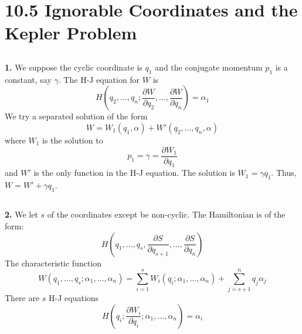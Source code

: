 \documentclass{article}
\begin{document}
	\section*{10.5 Ignorable Coordinates and the Kepler Problem}
	
	\subsection*{}
	\textbf{1.} We suppose the cyclic coordinate is $q_1$ and the conjugate momentum $p_1$ is a constant, say $\gamma$.
	The H-J equation for $W$ is
	\begin{equation*}
		H\left(q_2, \dots, q_n; \frac{\partial W}{\partial q_2}, \dots, \frac{\partial W}{\partial q_n}\right) = \alpha_1
	\end{equation*}
	We try a separated solution of the form
	\begin{equation*}
		W = W_1(q_1, \alpha) + W'(q_2, \dots, q_n, \alpha)
	\end{equation*}
	where $W_1$ is the solution to
	\begin{equation*}
		p_1 = \gamma = \frac{\partial W_1}{\partial q_1}
	\end{equation*}
	and $W'$ is the only function in the H-J equation.
	The solution is $W_1 = \gamma q_1$.
	Thus, $W = W' + \gamma q_1$.
	
	\subsection*{}
	\textbf{2.} We let $s$ of the coordinates except be non-cyclic. The Hamiltonian is of the form:
	\begin{equation*}
		H(q_1, \dots, q_s, \frac{\partial S}{\partial q_{s+1}}, \dots, \frac{\partial S}{\partial q_n})
	\end{equation*}
	The characteristic function
	\begin{equation*}
		W(q_1, \dots, q_s; \alpha_1, \dots, \alpha_n) = \sum_{i=1}^{s} W_i(q_i; \alpha_1, \dots, \alpha_n) + \sum_{j=s+1}^{n} q_j \alpha_j
	\end{equation*}
	There are $s$ H-J equations
	\begin{equation*}
		H(q_i; \frac{\partial W_i}{\partial q_i}; \alpha_1, \dots, \alpha_n) = \alpha_i
	\end{equation*}
	
\end{document}
